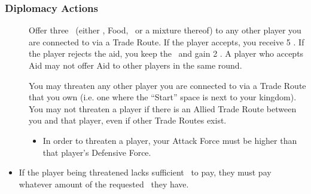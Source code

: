 \documentclass[10pt,twocolumn]{article}
\begin{document}
\subsubsection{Diplomacy Actions}
\begin{description}
\item[] Offer three \goods\ (either \money, Food, \minerals\ or a mixture thereof) to any other player you are connected to via a Trade Route. If the player accepts, you receive 5 \vps. If the player rejects the aid, you keep the \goods\ and gain 2 \vps. A player who accepts Aid may not offer Aid to other players in the same round.
\item[] You may threaten any other player you are connected to via a Trade Route that you own (i.e. one where the ``Start'' space is next to your kingdom). You may not threaten a player if there is an Allied Trade Route between you and that player, even if other Trade Routes exist.
\begin{itemize}
\item In order to threaten a player, your Attack Force must be higher than that player's Defensive Force.
\end{itemize}
\end{description}
\begin{itemize}[leftmargin=40pt]
\iftoggle{original-rules}{
\item If your Attack Force is sufficient, you may demand either \eraCost{3}{4}{5} \money\ or \eraCost{2}{3}{4} \vps. The player being threatened must pay if possible.
}{
\item If your Attack Force is higher than your opponents Defensive Force, you may demand either 3 \money\ or 2 \vps. The player being threatened must pay if possible.
\item If your Attack Force is 5 or more points higher than your opponents Defensive force, the demanded amounts increase to 5 \money\ or 4 \vps. The player being threatened must pay if possible.
}
\item If the player being threatened lacks sufficient \goods\ to pay, they must pay whatever amount of the requested \good\ they have.
\end{itemize}
\end{document}
